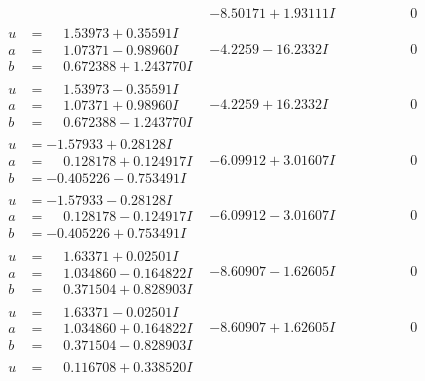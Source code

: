 \documentclass[1p]{elsarticle_modified}
\theoremstyle{definition}
\begin{document}
$$\begin{array}{c|c|c}
 & -8.50171 + 1.93111 I & \phantom{-0.000000 } 0 \\ \hline\begin{aligned}
u &= \phantom{-}1.53973 + 0.35591 I \\
a &= \phantom{-}1.07371 - 0.98960 I \\
b &= \phantom{-}0.672388 + 1.243770 I\end{aligned}
 & -4.2259 - 16.2332 I & \phantom{-0.000000 } 0 \\ \hline\begin{aligned}
u &= \phantom{-}1.53973 - 0.35591 I \\
a &= \phantom{-}1.07371 + 0.98960 I \\
b &= \phantom{-}0.672388 - 1.243770 I\end{aligned}
 & -4.2259 + 16.2332 I & \phantom{-0.000000 } 0 \\ \hline\begin{aligned}
u &= -1.57933 + 0.28128 I \\
a &= \phantom{-}0.128178 + 0.124917 I \\
b &= -0.405226 - 0.753491 I\end{aligned}
 & -6.09912 + 3.01607 I & \phantom{-0.000000 } 0 \\ \hline\begin{aligned}
u &= -1.57933 - 0.28128 I \\
a &= \phantom{-}0.128178 - 0.124917 I \\
b &= -0.405226 + 0.753491 I\end{aligned}
 & -6.09912 - 3.01607 I & \phantom{-0.000000 } 0 \\ \hline\begin{aligned}
u &= \phantom{-}1.63371 + 0.02501 I \\
a &= \phantom{-}1.034860 - 0.164822 I \\
b &= \phantom{-}0.371504 + 0.828903 I\end{aligned}
 & -8.60907 - 1.62605 I & \phantom{-0.000000 } 0 \\ \hline\begin{aligned}
u &= \phantom{-}1.63371 - 0.02501 I \\
a &= \phantom{-}1.034860 + 0.164822 I \\
b &= \phantom{-}0.371504 - 0.828903 I\end{aligned}
 & -8.60907 + 1.62605 I & \phantom{-0.000000 } 0 \\ \hline\begin{aligned}
u &= \phantom{-}0.116708 + 0.338520 I \\

\end{aligned}
\end{array}$$
\end{document}
